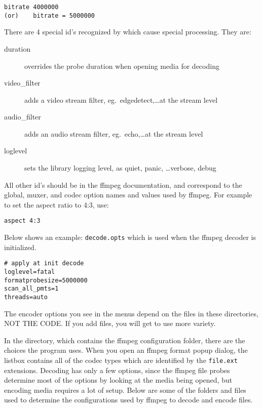 \begin{lstlisting}[style=sh]
      bitrate 4000000
(or)	bitrate = 5000000
\end{lstlisting}

There are 4 special id's recognized by \CGG{} which cause special processing.  They are:

\begin{description}
    \item[duration] overrides the probe duration when opening media for decoding
    \item[video\_filter] adds a video stream filter, eg.\ edgedetect,\dots at the stream level
    \item[audio\_filter] adds an audio stream filter, eg.\ echo,\dots at the stream level
    \item[loglevel] sets the library logging level, as quiet, panic, \dots verbose, debug
\end{description}

All other id's should be in the ffmpeg documentation, and correspond to the global, muxer, and codec option names and values used by ffmpeg.  For example to set the aspect ratio to 4:3, use:

\begin{lstlisting}[style=sh]
aspect 4:3
\end{lstlisting}

Below shows an example:  \texttt{decode.opts} which is used when the ffmpeg decoder is initialized.

\begin{lstlisting}[style=sh]
# apply at init decode
loglevel=fatal
formatprobesize=5000000
scan_all_pmts=1
threads=auto
\end{lstlisting}

The encoder options you see in the \CGG{} menus depend on the files in these directories, \textsc{NOT THE CODE}.  If you add files, you will get to use more variety.

In the \textit{\CGG{}} directory, which contains the ffmpeg configuration folder, there are the choices the program uses.  When you open an ffmpeg format popup dialog, the listbox contains all of the codec types which are identified by the \texttt{file.ext} extensions.  Decoding has only a few options, since the ffmpeg file probes determine most of the options by looking at the media being opened, but encoding media requires a lot of setup.  Below are some of the folders and files used to determine the configurations used by ffmpeg to decode and encode files.

